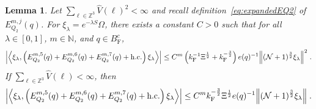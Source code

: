 \documentclass[12pt,a4paper]{article}
\numberwithin{equation}{section}
\newcommand{\NNN}{\mathbb{N}}
\newcommand{\1}{\mathbb{I}}
\newcommand{\F}{\mathrm{F}}
\newcommand{\Zstar}{\mathbb{Z}^3} %
\newcommand{\Z}{\mathbb{Z}}
\newcommand{\NN}{\mathcal{N}}
\newcommand{\half}{\frac{1}{2}}
\newcommand{\eva}[1]{\left\langle #1 \right\rangle}
\theoremstyle{plain}
\newtheorem{lemma}[theorem]{Lemma}
\theoremstyle{definition}
\theoremstyle{remark}
\theoremstyle{plain}
\theoremstyle{definition}
\theoremstyle{remark}
\begin{document}
\begin{lemma} \label{lem:EQ213}
Let $ \sum_{\ell \in \Zstar} \hat{V}(\ell)^2 < \infty $ and recall definition~\eqref{eq:expandedEQ2} of $ E_{Q_2}^{m,j}(q) $. For $\xi_\lambda = e^{-\lambda S} \Omega$, there exists a constant $ C > 0 $ such that for all $ \lambda \in [0,1] $, $ m \in \NNN $, and $ q \in B_{\F}^c $,
\begin{equation}
\begin{aligned}
	\abs{\eva{\xi_\lambda,\left(E^{m,5}_{Q_2}(q) + E^{m,6}_{Q_2}(q) + E^{m,7}_{Q_2}(q) + \mathrm{h.c.}\right) \xi_\lambda }}
	\leq C^m \left( k_{\F}^{-1} \Xi^{\half}
		+ k_{\F}^{-\frac 32} \right)
		e(q)^{-1}
		\norm { (\NN+1)^{\frac 32} \xi_\lambda }^2 \;. \label{eq:estEQ213_Coulomb}
\end{aligned}
\end{equation}
If $ \sum_{\ell \in \Zstar} \hat{V}(\ell) < \infty $, then
\begin{equation}
\begin{aligned}
	\abs{\eva{\xi_\lambda,\left(E^{m,5}_{Q_2}(q) + E^{m,6}_{Q_2} (q) + E^{m,7}_{Q_2}(q) + \mathrm{h.c.}\right) \xi_\lambda }}
	\leq C^m k_{\F}^{-\frac 32} \Xi^{\half} e(q)^{-1}
		\norm { (\NN+1)^{\frac 32} \xi_\lambda } \;. \label{eq:estEQ213}
\end{aligned}
\end{equation}
\end{lemma}
\end{document}
